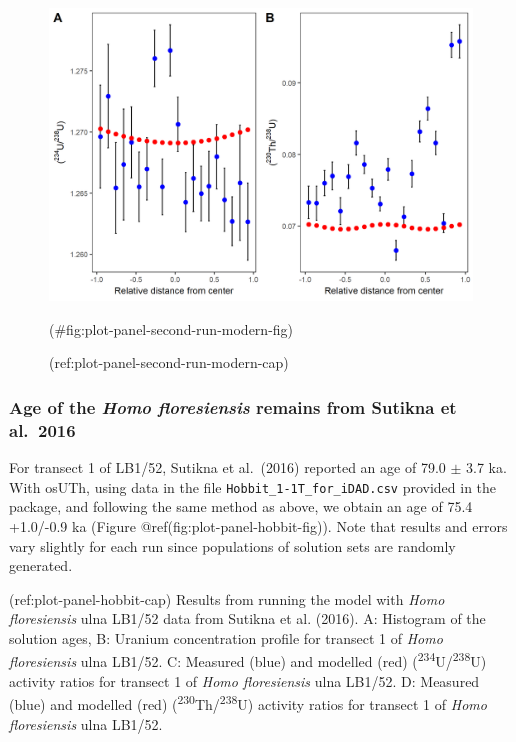 \documentclass[]{elsarticle} %
\begin{document}
\begin{figure}
\includegraphics[width=1\linewidth]{figures/plot-panel-second-run-modern} \caption{(ref:plot-panel-second-run-modern-cap)}(\#fig:plot-panel-second-run-modern-fig)
\end{figure}

\FloatBarrier

\hypertarget{age-of-the-homo-floresiensis-remains-from-sutikna-et-al.-2016}{%
\subsubsection{\texorpdfstring{Age of the \emph{Homo floresiensis} remains from Sutikna et al.~2016}{Age of the Homo floresiensis remains from Sutikna et al.~2016}}\label{age-of-the-homo-floresiensis-remains-from-sutikna-et-al.-2016}}

For transect 1 of LB1/52, Sutikna et al.~(2016) reported an age of 79.0 \(\pm\) 3.7 ka. With osUTh, using data in the file \texttt{Hobbit\_1-1T\_for\_iDAD.csv} provided in the package, and following the same method as above, we obtain an age of 75.4 +1.0/-0.9 ka (Figure @ref(fig:plot-panel-hobbit-fig)). Note that results and errors vary slightly for each run since populations of solution sets are randomly generated.

\newpage

(ref:plot-panel-hobbit-cap) Results from running the model with \emph{Homo floresiensis} ulna LB1/52 data from Sutikna et al. (2016). A: Histogram of the solution ages, B: Uranium concentration profile for transect 1 of \emph{Homo floresiensis} ulna LB1/52. C: Measured (blue) and modelled (red) (\textsuperscript{234}U/\textsuperscript{238}U) activity ratios for transect 1 of \emph{Homo floresiensis} ulna LB1/52. D: Measured (blue) and modelled (red) (\textsuperscript{230}Th/\textsuperscript{238}U) activity ratios for transect 1 of \emph{Homo floresiensis} ulna LB1/52.
\end{document}
